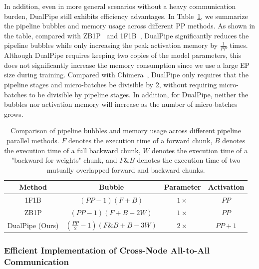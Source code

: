 \documentclass[11pt, a4paper, logo, copyright, nonumbering]{deepseek}
\begin{document}
\begin{CJK*}{UTF8}{gbsn}
In addition, even in more general scenarios without a heavy communication burden, DualPipe still exhibits efficiency advantages. 
In Table~\ref{tab:dualpipe-bubble}, we summarize the pipeline bubbles and memory usage across different PP methods. 
As shown in the table, compared with ZB1P~\citep{zerobubble} and 1F1B~\citep{pipedream}, DualPipe significantly reduces the pipeline bubbles while only increasing the peak activation memory by $\frac{1}{PP}$ times.
Although DualPipe requires keeping two copies of the model parameters, this does not significantly increase the memory consumption since we use a large EP size during training. 
Compared with Chimera~\citep{chimera}, DualPipe only requires that the pipeline stages and micro-batches be divisible by 2, without requiring micro-batches to be divisible by pipeline stages.
In addition, for DualPipe, neither the bubbles nor activation memory will increase as the number of micro-batches grows.

\begin{table}[t]
    \centering
    \setlength{\tabcolsep}{15pt}
    \begin{tabular}{c c c c}
        \toprule
        \textbf{Method} & \textbf{Bubble} & \textbf{Parameter} & \textbf{Activation} \\
        \midrule
        1F1B     & $(PP - 1)(F + B)$       & $1\times$ & $PP$ \\
        ZB1P     & $(PP - 1)(F + B - 2W)$   & $1\times$ & $PP$ \\
        DualPipe (Ours) & $(\frac{PP}{2} - 1)(F\&B + B - 3W)$ & $2\times$ & $PP + 1$ \\
        \bottomrule
    \end{tabular}
    \caption{
        Comparison of pipeline bubbles and memory usage across different pipeline parallel methods. $F$ denotes the execution time of a forward chunk, $B$ denotes the execution time of a full backward chunk, $W$ denotes the execution time of a "backward for weights" chunk, and $F\&B$ denotes the execution time of two mutually overlapped forward and backward chunks.
    }
    \label{tab:dualpipe-bubble}
\end{table}

\subsubsection{Efficient Implementation of Cross-Node All-to-All Communication}


\end{CJK*}
\end{document}
